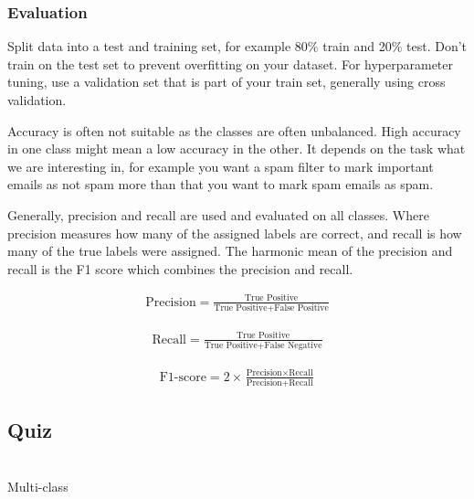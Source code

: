 \subsubsection{Evaluation}

Split data into a test and training set, for example 80\% train and
20\% test. Don't train on the
test set to prevent overfitting on your dataset. For hyperparameter
tuning, use a validation set that
is part of your train set, generally using cross validation.

Accuracy is often not suitable as the classes are often unbalanced.
High accuracy in one class might mean
a low accuracy in the other. It depends on the task what we are
interesting in, for example you want a spam
filter to mark important emails as not spam more than that you want
to mark spam emails as spam.

Generally, precision and recall are used and evaluated on all
classes. Where precision measures how many of
the assigned labels are correct, and recall is how many of the true
labels were assigned.
The harmonic mean of the precision and recall is the F1 score which
combines the precision and recall.

\begin{definition}[Precision]
  \begin{align*}
    \text{Precision} = \frac{\text{True Positive}}{\text{True
    Positive} + \text{False Positive}}
  \end{align*}
\end{definition}

\begin{definition}[Recall]
  \begin{align*}
    \text{Recall} = \frac{\text{True Positive}}{\text{True Positive} +
    \text{False Negative}}
  \end{align*}
\end{definition}

\begin{definition}[F1-score]
  \begin{align*}
    \text{F1-score} = 2 \times \frac{\text{Precision} \times
    \text{Recall}}{\text{Precision} + \text{Recall}}
  \end{align*}
\end{definition}

\subsection{Quiz}

\begin{quiz}
  ~\\
  Multi-class
\end{quiz}

